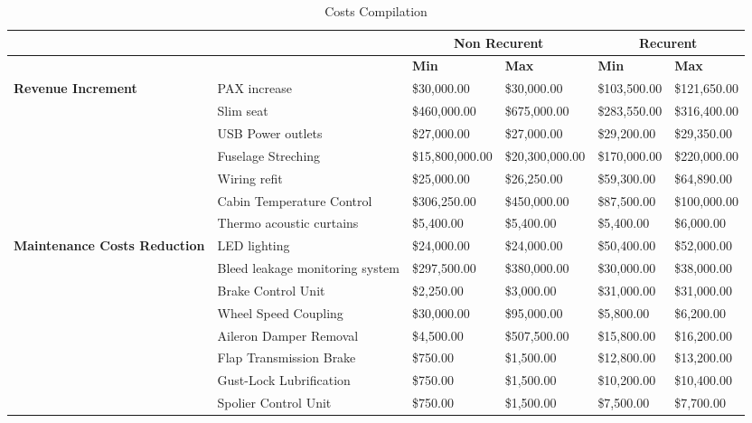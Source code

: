 \begin{table}[H]
  \scriptsize
  \centering
  \caption{Costs Compilation}
    \begin{tabular}{| p{3cm} | p{4cm} | l | l | l | l |}
    \toprule
          &       & \multicolumn{2}{c}{\textbf{Non Recurent}} & \multicolumn{2}{c}{\textbf{Recurent}} \\
    \midrule
          &       & \textbf{Min} & \textbf{Max} & \textbf{Min} & \textbf{Max} \\
    \multirow{7}[14]{*}{\textbf{Revenue Increment}} & PAX increase & \$30,000.00 & \$30,000.00 & \$103,500.00 & \$121,650.00 \\
          & Slim seat & \$460,000.00 & \$675,000.00 & \$283,550.00 & \$316,400.00 \\
          & USB Power outlets & \$27,000.00 & \$27,000.00 & \$29,200.00 & \$29,350.00 \\
          & Fuselage Streching & \$15,800,000.00 & \$20,300,000.00 & \$170,000.00 & \$220,000.00 \\
          & Wiring refit & \$25,000.00 & \$26,250.00 & \$59,300.00 & \$64,890.00 \\
          & Cabin Temperature Control & \$306,250.00 & \$450,000.00 & \$87,500.00 & \$100,000.00 \\
          & Thermo acoustic curtains & \$5,400.00 & \$5,400.00 & \$5,400.00 & \$6,000.00 \\
    \multirow{14}[28]{*}{ \textbf{Maintenance Costs Reduction}} & LED lighting & \$24,000.00 & \$24,000.00 & \$50,400.00 & \$52,000.00 \\
          & Bleed leakage monitoring system & \$297,500.00 & \$380,000.00 & \$30,000.00 & \$38,000.00 \\
          & Brake Control Unit & \$2,250.00 & \$3,000.00 & \$31,000.00 & \$31,000.00 \\
          & Wheel Speed Coupling & \$30,000.00 & \$95,000.00 & \$5,800.00 & \$6,200.00 \\
          & Aileron Damper Removal & \$4,500.00 & \$507,500.00 & \$15,800.00 & \$16,200.00 \\
          & Flap Transmission Brake & \$750.00 & \$1,500.00 & \$12,800.00 & \$13,200.00 \\
          & Gust-Lock Lubrification & \$750.00 & \$1,500.00 & \$10,200.00 & \$10,400.00 \\
          & Spolier Control Unit & \$750.00 & \$1,500.00 & \$7,500.00 & \$7,700.00 \\

\end{tabular}
\end{table}
